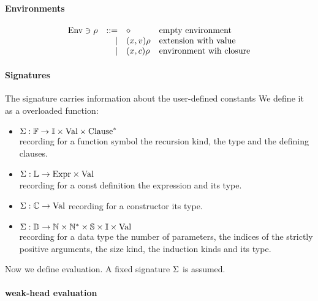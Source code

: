 \paragraph*{Environments}
\[
\begin{array}{lrll}
\mathrm{Env} \ni \rho & ::= & \diamond & \mbox{empty environment}\\
& \mid & (x,v) \rho & \mbox{extension with value}\\
& \mid & (x,c) \rho & \mbox{environment wih closure} 
\end{array}
\]

\paragraph*{Signatures}
The signature carries information about the user-defined constants
We define it as a overloaded function:
\begin{itemize}
\item
$ \mathrm{\Sigma} : \mathbb{F} \rightarrow \mathbb{I} \times \mathrm{Val} \times {\mathrm{Clause}}^{\ast}$\\
recording for a function symbol the recursion kind, the type and the defining clauses.
\item
$ \mathrm{\Sigma} : \mathbb{L} \rightarrow \mathrm{Expr} \times \mathrm{Val} $ \\
recording for a const definition the expression and its type. 
\item
$ \mathrm{\Sigma} : \mathbb{C} \rightarrow \mathrm{Val} $
recording for a constructor its type.
\item
$ \mathrm{\Sigma} : \mathbb{D} \rightarrow \mathbb{N} \times {\mathbb{N}}^{\ast} \times \mathbb{S} \times \mathbb{I} \times \mathrm{Val} $\\
recording for a data type the number of parameters, the indices of the strictly positive arguments,
the size kind, the induction kinds and its type.
\end{itemize}
Now we define evaluation. A fixed signature $\mathrm{\Sigma}$ is assumed.
\paragraph*{weak-head evaluation}


